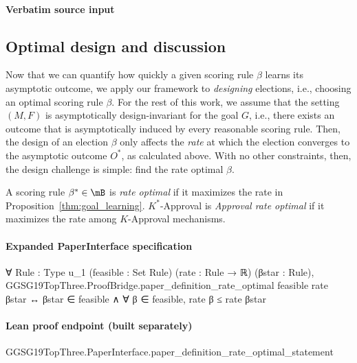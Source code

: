 \documentclass[10pt]{article}
\begin{document}
\paragraph{Verbatim source input}
\begin{ReviewVerbatim}
\subsection{Optimal design and discussion}
Now that we can quantify how quickly a given scoring rule $\beta$ learns its asymptotic outcome, we apply our framework to \textit{designing} elections, i.e., choosing an optimal scoring rule $\beta$. For the rest of this work, we assume that the setting $(M,F)$ is asymptotically design-invariant for the goal $G$, i.e., there exists an outcome that is asymptotically induced by every reasonable scoring rule. Then, the design of an election $\beta$ only affects the \textit{rate} at which the election converges to the asymptotic outcome $O^*$, as calculated above. With no other constraints, then, the design challenge is simple: find the rate optimal $\beta$.
\begin{definition}
	A scoring rule $\beta^* \in \mB$ is \textit{rate optimal} if it maximizes the rate in Proposition~\ref{thm:goal_learning}. %
	$K^*$-Approval is \textit{Approval rate optimal} if it maximizes the rate among $K$-Approval mechanisms.
\end{definition}
\end{ReviewVerbatim}


\paragraph{Expanded PaperInterface specification}
\begin{ReviewVerbatim}
∀ {Rule : Type u_1} (feasible : Set Rule) (rate : Rule → ℝ) (βstar : Rule),
  GGSG19TopThree.ProofBridge.paper_definition_rate_optimal feasible rate βstar ↔
    βstar ∈ feasible ∧ ∀ β ∈ feasible, rate β ≤ rate βstar
\end{ReviewVerbatim}

\paragraph{Lean proof endpoint (built separately)}\begin{ReviewVerbatim}
GGSG19TopThree.PaperInterface.paper_definition_rate_optimal_statement
\end{ReviewVerbatim}
\end{document}
